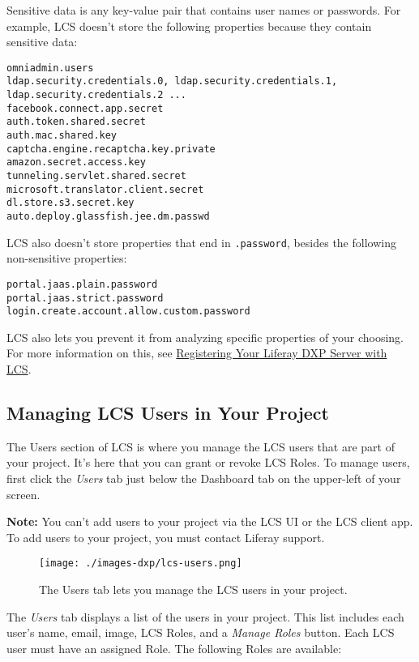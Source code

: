 Sensitive data is any key-value pair that contains user names or
passwords. For example, LCS doesn't store the following properties
because they contain sensitive data:

\begin{verbatim}
omniadmin.users
ldap.security.credentials.0, ldap.security.credentials.1, ldap.security.credentials.2 ...
facebook.connect.app.secret
auth.token.shared.secret
auth.mac.shared.key
captcha.engine.recaptcha.key.private
amazon.secret.access.key
tunneling.servlet.shared.secret
microsoft.translator.client.secret
dl.store.s3.secret.key
auto.deploy.glassfish.jee.dm.passwd
\end{verbatim}

LCS also doesn't store properties that end in \texttt{.password},
besides the following non-sensitive properties:

\begin{verbatim}
portal.jaas.plain.password
portal.jaas.strict.password
login.create.account.allow.custom.password
\end{verbatim}

LCS also lets you prevent it from analyzing specific properties of your
choosing. For more information on this, see
\href{/docs/7-0/deploy/-/knowledge_base/d/registering-your-dxp-server-with-lcs}{Registering
Your Liferay DXP Server with LCS}.

\subsection{Managing LCS Users in Your
Project}\label{managing-lcs-users-in-your-project}

The Users section of LCS is where you manage the LCS users that are part
of your project. It's here that you can grant or revoke LCS Roles. To
manage users, first click the \emph{Users} tab just below the Dashboard
tab on the upper-left of your screen.

\noindent\hrulefill

\textbf{Note:} You can't add users to your project via the LCS UI or the
LCS client app. To add users to your project, you must contact Liferay
support.

\noindent\hrulefill

\begin{figure}
\centering
\texttt{[image: ./images-dxp/lcs-users.png]}
\caption{The Users tab lets you manage the LCS users in your project.}
\end{figure}

The \emph{Users} tab displays a list of the users in your project. This
list includes each user's name, email, image, LCS Roles, and a
\emph{Manage Roles} button. Each LCS user must have an assigned Role.
The following Roles are available:

